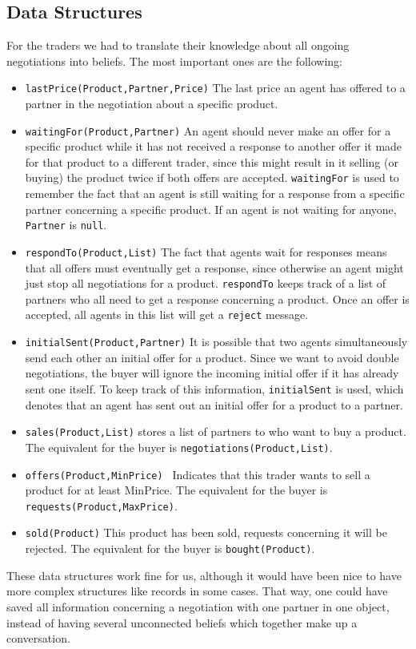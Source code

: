 \documentclass[a4paper,11pt]{article}
\begin{document}
\subsection{Data Structures}
For the traders we had to translate their knowledge about all ongoing negotiations into beliefs. The most important ones are the following:
\begin{itemize}
  \item \texttt{lastPrice(Product,Partner,Price)} The last price an agent has offered to a partner in the negotiation about a specific product.
  \item \texttt{waitingFor(Product,Partner)} An agent should never make an offer for a specific product while it has not received a response to another offer it made for that product to a different trader, since this might result in it selling (or buying) the product twice if both offers are accepted. \texttt{waitingFor} is used to remember the fact that an agent is still waiting for a response from a specific partner concerning a specific product. If an agent is not waiting for anyone, \texttt{Partner} is \texttt{null}.
 \item \texttt{respondTo(Product,List)} The fact that agents wait for responses means that all offers must eventually get a response, since otherwise an agent might just stop all negotiations for a product. \texttt{respondTo} keeps track of a list of partners who all need to get a response concerning a product. Once an offer is accepted, all agents in this list will get a \texttt{reject} message.
\item \texttt{initialSent(Product,Partner)} It is possible that two agents simultaneously send each other an initial offer for a product. Since we want to avoid double negotiations, the buyer will ignore the incoming initial offer if it has already sent one itself. To keep track of this information, \texttt{initialSent} is used, which denotes that an agent has sent out an initial offer for a product to a partner.
\item \texttt{sales(Product,List)} stores a list of partners to who want to buy a product. The equivalent for the buyer is \texttt{negotiations(Product,List)}.
\item \texttt{offers(Product,MinPrice) } Indicates that this trader wants to sell a product for
at least MinPrice. The equivalent for the buyer is \texttt{requests(Product,MaxPrice)}.
\item \texttt{sold(Product)} This product has been sold, requests concerning it will be
rejected. The equivalent for the buyer is \texttt{bought(Product)}.
\end{itemize}
\noident These data structures work fine for us, although it would have been nice to have more complex structures like records in some cases. That way, one could have saved all information concerning a negotiation with one partner in one object, instead of having several unconnected beliefs which together make up a conversation. 
\end{document}
